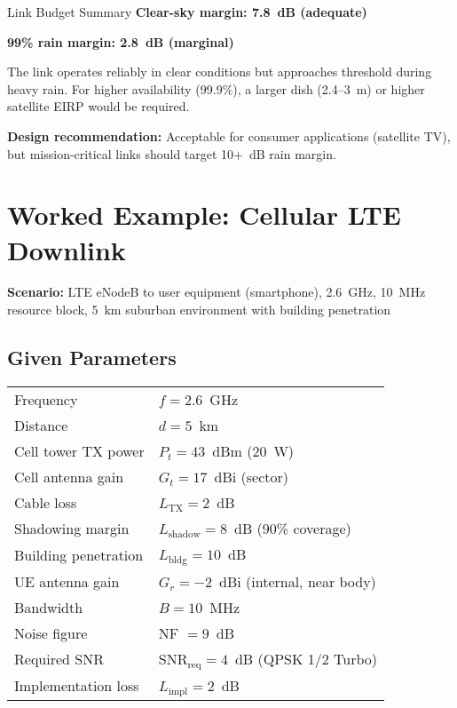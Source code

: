 \begin{calloutbox}[colback=yellow!10,colframe=orange]{Link Budget Summary}
\textbf{Clear-sky margin: 7.8~dB (adequate)}

\textbf{99\% rain margin: 2.8~dB (marginal)}

The link operates reliably in clear conditions but approaches threshold during heavy rain. For higher availability (99.9\%), a larger dish (2.4--3~m) or higher satellite EIRP would be required.

\textbf{Design recommendation:} Acceptable for consumer applications (satellite TV), but mission-critical links should target 10+~dB rain margin.
\end{calloutbox}

\section{Worked Example: Cellular LTE Downlink}

\textbf{Scenario:} LTE eNodeB to user equipment (smartphone), 2.6~GHz, 10~MHz resource block, 5~km suburban environment with building penetration

\subsection*{Given Parameters}

\begin{tabular}{@{}ll@{}}
Frequency & $f = 2.6$~GHz \\
Distance & $d = 5$~km \\
Cell tower TX power & $P_t = 43$~dBm (20~W) \\
Cell antenna gain & $G_t = 17$~dBi (sector) \\
Cable loss & $L_{\text{TX}} = 2$~dB \\
Shadowing margin & $L_{\text{shadow}} = 8$~dB (90\% coverage) \\
Building penetration & $L_{\text{bldg}} = 10$~dB \\
UE antenna gain & $G_r = -2$~dBi (internal, near body) \\
Bandwidth & $B = 10$~MHz \\
Noise figure & NF $= 9$~dB \\
Required SNR & $\text{SNR}_{\text{req}} = 4$~dB (QPSK 1/2 Turbo) \\
Implementation loss & $L_{\text{impl}} = 2$~dB \\
\end{tabular}

